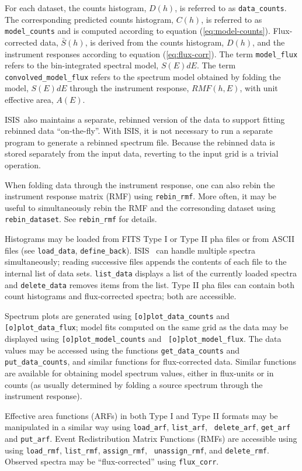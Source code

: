 \documentclass{book}
\newcommand{\isisx}{{\sc ISIS~}}
\newcommand{\isis}{{\sc ISIS}}
\begin{document}
{For each dataset, the counts histogram, $D(h)$, is referred to
as \verb|data_counts|.  The corresponding predicted counts
histogram, $C(h)$, is referred to as \verb|model_counts| and is
computed according to equation (\ref{eq:model-counts}).
Flux-corrected data, ${\bar S(h)}$, is derived from the counts
histogram, $D(h)$, and the instrument responses according to
equation (\ref{eq:flux-corr}).  The term \verb|model_flux|
refers to the bin-integrated spectral model, $S(E)dE$. The term
\verb|convolved_model_flux| refers to the spectrum model
obtained by folding the model, $S(E)dE$ through the instrument
response, $RMF(h,E)$, with unit effective area, $A(E)$.

\isisx also maintains a separate, rebinned version of the data to
support fitting rebinned data ``on-the-fly''.  With \isis, it is not
necessary to run a separate program to generate a rebinned spectrum
file.  Because the rebinned data is stored separately from the input
data, reverting to the input grid is a trivial operation.

When folding data through the instrument response, one can also
rebin the instrument response matrix (RMF) using \verb|rebin_rmf|.
More often, it may be useful to simultaneously rebin the RMF and
the corresonding dataset using \verb|rebin_dataset|.
See \verb|rebin_rmf| for details.

Histograms may be loaded from FITS Type I or Type II pha files or
from ASCII files (see \verb|load_data|, \verb|define_back|).  \isisx
can handle multiple spectra simultaneously; reading successive
files appends the contents of each file to the internal list of
data sets.  {\tt list\_data} displays a list of the currently
loaded spectra and {\tt delete\_data} removes items from the list.
Type II pha files can contain both count histograms and
flux-corrected spectra; both are accessible.

Spectrum plots are generated using {\tt [o]plot\_data\_counts} and
{\tt [o]plot\_data\_flux}; model fits computed on the same grid as the
data may be displayed using {\tt [o]plot\_model\_counts} and {\tt
[o]plot\_model\_flux}.  The data values may be accessed using the
functions {\tt get\_data\_counts} and {\tt put\_data\_counts}, and
similar functions for flux-corrected data. Similar functions are
available for obtaining model spectrum values, either in flux-units or
in counts (as usually determined by folding a source spectrum through
the instrument response).

Effective area functions (ARFs) in both Type I and Type II formats may be
manipulated in a similar way using {\tt load\_arf}, {\tt list\_arf}, {\tt
delete\_arf}, {\tt get\_arf} and {\tt put\_arf}.
Event Redistribution Matrix Functions (RMFs) are accessible using
using {\tt load\_rmf}, {\tt list\_rmf}, {\tt assign\_rmf}, {\tt
unassign\_rmf}, and {\tt delete\_rmf}.
Observed spectra may be ``flux-corrected'' using {\tt flux\_corr}.

}
\end{document}
